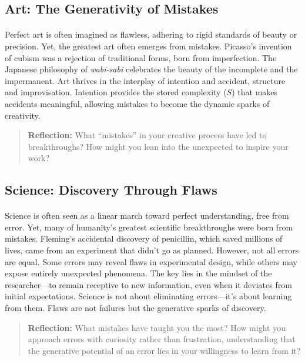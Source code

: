 \documentclass[12pt]{article}
\begin{document}
\subsection{Art: The Generativity of Mistakes}
\paragraph{}
Perfect art is often imagined as flawless, adhering to rigid standards of beauty or precision. Yet, the greatest art often emerges from mistakes. Picasso’s invention of cubism was a rejection of traditional forms, born from imperfection. The Japanese philosophy of \textit{wabi-sabi} celebrates the beauty of the incomplete and the impermanent. Art thrives in the interplay of intention and accident, structure and improvisation. Intention provides the stored complexity (\(S\)) that makes accidents meaningful, allowing mistakes to become the dynamic sparks of creativity.

\begin{quote}
\textbf{Reflection:}  
What “mistakes” in your creative process have led to breakthroughs? How might you lean into the unexpected to inspire your work?
\end{quote}

\subsection{Science: Discovery Through Flaws}
\paragraph{}
Science is often seen as a linear march toward perfect understanding, free from error. Yet, many of humanity’s greatest scientific breakthroughs were born from mistakes. Fleming’s accidental discovery of penicillin, which saved millions of lives, came from an experiment that didn’t go as planned. However, not all errors are equal. Some errors may reveal flaws in experimental design, while others may expose entirely unexpected phenomena. The key lies in the mindset of the researcher—to remain receptive to new information, even when it deviates from initial expectations. Science is not about eliminating errors—it’s about learning from them. Flaws are not failures but the generative sparks of discovery.

\begin{quote}
\textbf{Reflection:}
What mistakes have taught you the most? How might you approach errors with curiosity rather than frustration, understanding that the generative potential of an error lies in your willingness to learn from it?
\end{quote}
\end{document}

